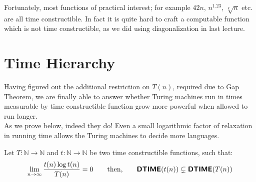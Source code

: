 \documentclass[usletter]{article}
\newcommand{\namedset}[1]
           {\ensuremath{\mathbb{#1}}}
\newcommand{\family}[1]
           {\ensuremath{\textnormal{\textsf{\textbf{#1}}}}}
\newcommand{\term}[1]{\textsf{#1}}
\newcommand{\namethm}[1]{\term{#1} Theorem}
\begin{document}
\noindent
Fortunately, most functions of practical interest; for example $42n$, $n^{1.23}$, $\sqrt[k]{n}$ etc. are all \term{time constructible}. In fact it is quite hard to craft a computable function which is not \term{time constructible}, as we did using diagonalization in last lecture.


\section{Time Hierarchy}

Having figured out the additional restriction on $T(n)$, required due to \namethm{Gap}, we are finally able to answer whether Turing machines run in times measurable by \term{time constructible} function grow more powerful when allowed to run longer. \\
As we prove below, indeed they do! Even a small logarithmic factor of relaxation in running time allows the Turing machines to decide more languages.

\begin{theorem}
\label{dtime_hierarchy_theorem}
Let $T: \namedset{N} \to \namedset{N}$ and $t: \namedset{N} \to \namedset{N}$ be two \term{time constructible} functions, such that:
$$
\lim_{n \to \infty} \frac{t(n) \log{t(n)}}{T(n)} = 0
\qquad \textnormal{then,} \qquad \family{DTIME}(t(n)) \subsetneq \family{DTIME}(T(n))
$$
\end{theorem}
\end{document}
